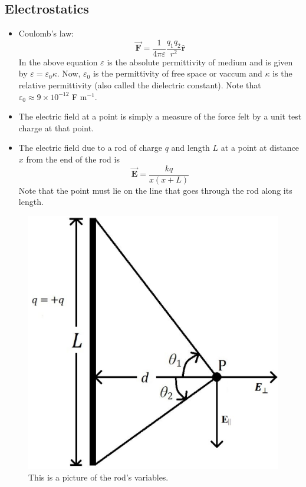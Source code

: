 \documentclass{scrartcl}
\begin{document}
    \subsection{Electrostatics}
    \begin{itemize}
        \item Coulomb's law: \[\vec{\mathbf F}=\frac1{4\pi\varepsilon}\frac{q_1q_2}{r^2}\hat{\mathbf r}\] In the above equation $\varepsilon$ is the absolute permittivity of medium and is given by $\varepsilon=\varepsilon_0\kappa$. Now, $\varepsilon_0$ is the permittivity of free space or vaccum and $\kappa$ is the relative permittivity (also called the dielectric constant). Note that $\varepsilon_0\approx9\times 10^{-12}$ F m$^{-1}$.
        \item The electric field at a point is simply a measure of the force felt by a unit test charge at that point.
        \item The electric field due to a rod of charge $q$ and length $L$ at a point at distance $x$ from the end of the rod is \[\vec{\mathbf E}=\frac{kq}{x\left(x+L\right)}\] Note that the point must lie on the line that goes through the rod along its length.
    \end{itemize}
    \begin{figure}[H]
        \centering
        \begin{minipage}[b]{0.5\textwidth}
            \includegraphics[width=\textwidth]{rod.eps}
            \caption{This is a picture of the rod's variables.}
        \end{minipage}
    \end{figure}
\end{document}
